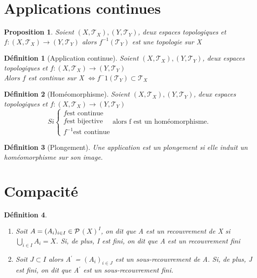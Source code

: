 \documentclass{report}
\newtheorem{definition}{Définition}[section]
\theoremstyle{plain}
\newtheorem{proposition}{Proposition}[section]
\newcommand\T{\mathcal{T}}
\begin{document}
	\section{Applications continues}

		\begin{proposition}
			Soient $(X,\T_X), (Y, \T_Y)$, deux espaces topologiques et $f : (X,\T_X) \rightarrow (Y, \T_Y)$ alors $f^{-1}(\T_Y)$ est une topologie sur X
		\end{proposition}

		\begin{definition}[Application continue]
			Soient $(X,\T_X), (Y, \T_Y)$, deux espaces topologiques et $f : (X,\T_X) \rightarrow (Y, \T_Y)$\\
			Alors $f$ est continue sur X $\Longleftrightarrow f^-1({\T_Y}) \subset \T_X$	
		\end{definition}

		\begin{definition}[Homéomorphisme]
			Soient $(X,\T_X), (Y, \T_Y)$, deux espaces topologiques et $f : (X,\T_X) \rightarrow (Y, \T_Y)$\\
			$$Si \left\{
				\begin{array}{lll}
					f \mbox{est continue}\\
					f \mbox{est bijective}\\
					f^{-1} \mbox{est continue}
				\end{array}
			\right. \mbox{alors f est un homéomorphisme.}$$
		\end{definition}

		\begin{definition}[Plongement]
			Une application est un plongement si elle induit un homéomorphisme sur son image.
		\end{definition}


	\section{Compacité}

		\begin{definition}
			\begin{enumerate}
				\item Soit $A = (A_i)_{i\in I} \in \cal{P}$$(X)^I$, on dit que A est un recouvrement de X si $\bigcup\limits_{i\in I} A_i = X$. Si, de plus, I est fini, on dit que A est un recouvrement fini
				\item Soit $J \subset I$ alors A$^\prime$ = $(A_i)_{i\in J}$ est un sous-recouvrement de A. Si, de plus, J est fini, on dit que A$^\prime$ est un sous-recouvrement fini.
			\end{enumerate}
		\end{definition}
\end{document}
